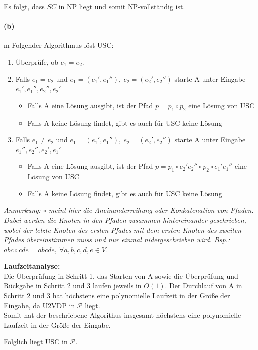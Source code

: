 	Es folgt, dass $SC$ in NP liegt und somit NP-vollständig ist.

\paragraph{(b)}m 
	Folgender Algorithmus löst USC:
	\begin{enumerate}
		\item Überprüfe, ob $e_1 = e_2$.
		\item Falls $e_1 = e_2$ und $e_1=(e_1',e_1''),\ e_2=(e_2',e_2'')$ starte A unter Eingabe $e_1',e_1'',e_2'',e_2'$ \begin{itemize}
			\item Falls A eine Lösung ausgibt, ist der Pfad $p=p_1\circ p_2$ eine Lösung von USC
			\item Falls A keine Lösung findet, gibt es auch für USC keine Lösung
		\end{itemize}
		\item Falls $e_1 \neq  e_2$ und $e_1=(e_1',e_1''),\ e_2=(e_2',e_2'')$ starte A unter Eingabe $e_1'',e_2'',e_2',e_1'$ \begin{itemize}
			\item Falls A eine Lösung ausgibt, ist der Pfad $p=p_1\circ e_2'e_2''\circ p_2\circ e_1'e_1''$ eine Lösung von USC
			\item Falls A keine Lösung findet, gibt es auch für USC keine Lösung
		\end{itemize}
	\end{enumerate}
	\textit{Anmerkung: $\circ $ meint hier die Aneinanderreihung oder Konkatenation von Pfaden. Dabei werden die Knoten in den Pfaden zusammen hintereinander geschrieben, wobei der letzte Knoten des ersten Pfades mit dem ersten Knoten des zweiten Pfades übereinstimmen muss und nur einmal nidergeschrieben wird. Bsp.: $abc\circ cde=abcde,\ \forall a,b,c,d,e \in V$.}

	\textbf{Laufzeitanalyse:}\\
	Die Überprüfung in Schritt 1, das Starten von A sowie die Überprüfung und Rückgabe in Schritt 2 und 3 laufen jeweils in $O(1)$. Der Durchlauf von A in Schritt 2 und 3 hat höchstens eine polynomielle Laufzeit in der Größe der Eingabe, da U2VDP in $\mathcal{P}$ liegt.\\
	Somit hat der beschriebene Algorithus insgesamt höchstens eine polynomielle Laufzeit in der Größe der Eingabe.

	Folglich liegt USC in $\mathcal{P}$.

